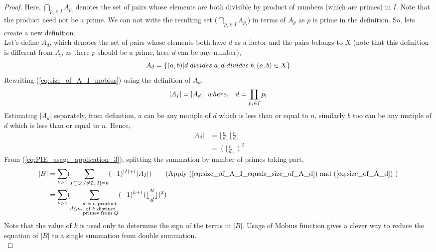 \begin{proof}
Here, $\bigcap_{p_i \in I} A_{p_i}$ denotes the set of pairs whose elements are both divisible by product of numbers (which are primes) in $I$. Note that the product need not be a prime. We can not write the resulting set ($\bigcap_{p_i \in I} A_{p_i}$) in terms of $A_p$ as $p$ is prime in the definition. So, lets create a new definition.\\
Let's define $A_d$, which denotes the set of pairs whose elements both have $d$ as a factor and the pairs belongs to $X$ (note that this definition is different from $A_p$ as there $p$ should be a prime, here $d$ can be any number), $$A_d = \{(a,b)|d \hspace{0.1cm}divides \hspace{0.1cm} a, d \hspace{0.1cm}divides \hspace{0.1cm} b, (a,b) \in X\}$$
Rewriting (\ref{eq:size_of_A_I_mobius}) using the definition of $A_d$,
\begin{align}
|A_I| =|A_d| \label{eq:size_of_A_I_equals_size_of_A_d}
~~where, \hspace{0.3cm}d = \prod_{p_i \in I}p_i
\end{align}
Estimating $|A_d|$ separately, from definition, $a$ can be any mutiple of $d$ which is less than or equal to $n$, similarly $b$ too can be any mutiple of $d$ which is less than or equal to $n$. Hence, 
\begin{align}
|A_d| &=\lfloor \frac{n}{d} \rfloor \lfloor \frac{n}{d} \rfloor\nonumber\\
&=(\lfloor \frac{n}{d} \rfloor)^2 \label{eq:size_of_A_d}
\end{align}
From (\ref{eq:PIE_usage_application_3}), splitting the summation by number of primes taking part, 
\begin{align}
|B| &=\sum_{k \geq 1} (\sum_{I \subseteq Q, I \neq \emptyset,|I| = k} (-1)^{|I|+1} |A_I|) \nonumber \tag{Apply (\ref{eq:size_of_A_I_equals_size_of_A_d}) and (\ref{eq:size_of_A_d}) }\\
&=  \sum_{k \geq 1}(\sum_{d \le n,\substack{d\text{ is a product } \\ \text{of } k \text{ distinct}\\ \text{primes from }Q} }(-1)^{k+1}(\lfloor \frac{n}{d} \rfloor)^2)  \label{eq:bad_set}
\end{align}
Note that the value of $k$ is used only to determine the sign of the terms in $|B|$. Usage of Mobius function gives a clever way to reduce the equation of $|B|$ to a single summation from double summation.\\

\end{proof}
